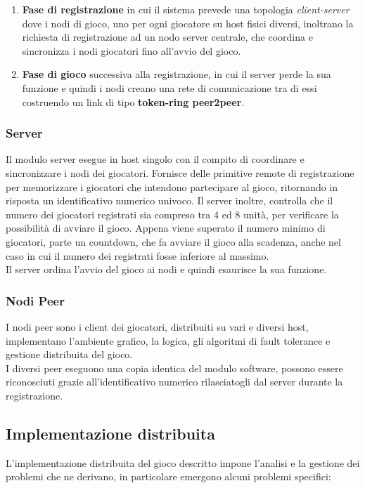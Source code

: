 \documentclass[10pt,a4paper]{article}
\begin{document}
\begin{enumerate}
\item\textbf{Fase di registrazione} in cui il sistema prevede una topologia \textit{client-server} dove i nodi di gioco, uno per ogni giocatore su host fisici diversi, inoltrano la richiesta di registrazione ad un nodo server centrale, che coordina e sincronizza i nodi giocatori fino all'avvio del gioco.

\item\textbf{Fase di gioco} successiva alla registrazione, in cui il server perde la sua funzione e quindi i nodi creano una rete di comunicazione tra di essi costruendo un link di tipo \textbf{token-ring peer2peer}.
\end{enumerate}
 
\subsubsection{Server}
Il modulo server esegue in host singolo con il compito di coordinare e sincronizzare i nodi dei giocatori. Fornisce delle primitive remote di registrazione per memorizzare i giocatori che intendono partecipare al gioco, ritornando in risposta un identificativo numerico univoco. Il server inoltre, controlla che il numero dei giocatori registrati sia compreso tra 4 ed 8 unità, per verificare la possibilità di avviare il gioco. Appena viene superato il numero minimo di giocatori, parte un countdown, che fa avviare il gioco alla scadenza, anche nel caso in cui il numero dei registrati fosse inferiore al massimo. \\ Il server ordina l'avvio del gioco ai nodi e quindi esaurisce la sua funzione.

\subsubsection{Nodi Peer}
I nodi peer sono i client dei giocatori, distribuiti su vari e diversi host, implementano l'ambiente grafico, la logica, gli algoritmi di fault tolerance e gestione distribuita del gioco.\\ I diversi peer eseguono una copia identica del modulo software, possono essere riconosciuti grazie all'identificativo numerico rilasciatogli dal server durante la registrazione.

\subsection{Implementazione distribuita}
L'implementazione distribuita del gioco descritto impone l'analisi e la gestione dei problemi che ne derivano, in particolare emergono alcuni problemi specifici:
\end{document}
